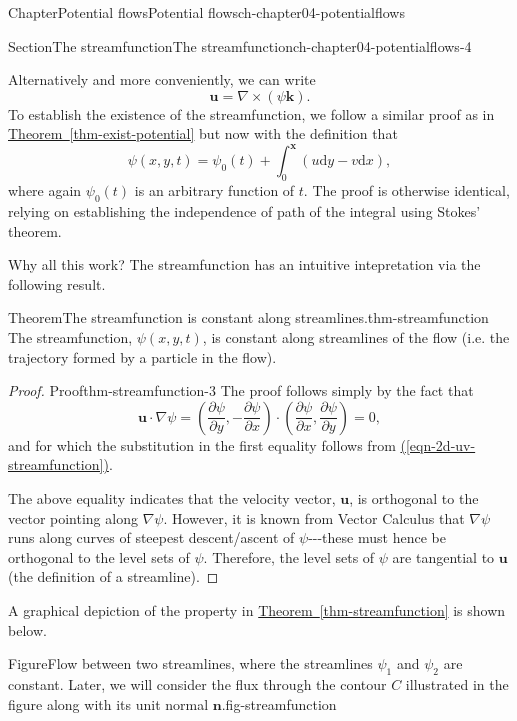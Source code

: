 \documentclass[oneside,10pt,]{book}
\newcommand{\xreffont}{\relax}
\numberwithin{equation}{section}
\newcommand{\de}{\mathrm{d}}
\newcommand{\pd}[2]{\frac{\partial#1}{\partial#2}}
\newcommand{\bx}{\boldsymbol{x}}
\newcommand{\bn}{\boldsymbol{n}}
\newcommand{\bu}{\boldsymbol{u}}
\newcommand{\bk}{\boldsymbol{k}}
\begin{document}
\begin{chapterptx}{Chapter}{Potential flows}{}{Potential flows}{}{}{ch-chapter04-potentialflows}
\begin{sectionptx}{Section}{The streamfunction}{}{The streamfunction}{}{}{ch-chapter04-potentialflows-4}
\begin{introduction}{}
Alternatively and more conveniently, we can write%
\begin{equation}
\bu = \nabla \times (\psi \bk).\label{eqn-2d-streamfunction}
\end{equation}
To establish the existence of the streamfunction, we follow a similar proof as in \hyperref[thm-exist-potential]{Theorem~{\xreffont\ref{thm-exist-potential}}} but now with the definition that%
\begin{equation}
\psi(x, y, t) = \psi_0(t) + \int_0^{\bx} (u \de{y} - v \de{x}),\label{eqn-streamfunction-def-psi}
\end{equation}
where again \(\psi_0(t)\) is an arbitrary function of \(t\). The proof is otherwise identical, relying on establishing the independence of path of the integral using Stokes' theorem.%
\par
Why all this work? The streamfunction has an intuitive intepretation via the following result.%
\begin{theorem}{Theorem}{The streamfunction is constant along streamlines.}{}{thm-streamfunction}%
The streamfunction, \(\psi(x, y, t)\), is constant along streamlines of the flow (i.e. the trajectory formed by a particle in the flow).%
\end{theorem}
\begin{proof}{Proof}{}{thm-streamfunction-3}
The proof follows simply by the fact that%
\begin{equation*}
\bu \cdot \nabla \psi = \left(\pd{\psi}{y}, -\pd{\psi}{x}\right) \cdot \left(\pd{\psi}{x}, \pd{\psi}{y}\right) = 0,
\end{equation*}
and for which the substitution in the first equality follows from \hyperref[eqn-2d-uv-streamfunction]{({\xreffont\ref{eqn-2d-uv-streamfunction}})}.%
\par
The above equality indicates that the velocity vector, \(\bu\), is orthogonal to the vector pointing along \(\nabla \psi\). However, it is known from Vector Calculus that \(\nabla \psi\) runs along curves of steepest descent\slash{}ascent of \(\psi\)-{}-{}-these must hence be orthogonal to the level sets of \(\psi\). Therefore, the level sets of \(\psi\) are tangential to \(\bu\) (the definition of a streamline).%
\end{proof}
A graphical depiction of the property in \hyperref[thm-streamfunction]{Theorem~{\xreffont\ref{thm-streamfunction}}} is shown below.%
\begin{figureptx}{Figure}{Flow between two streamlines, where the streamlines \(\psi_1\) and \(\psi_2\) are constant. Later, we will consider the flux through the contour \(C\) illustrated in the figure along with its unit normal \(\bn\).}{fig-streamfunction}{}%

\end{figureptx}
\end{introduction}
\end{sectionptx}
\end{chapterptx}
\end{document}
